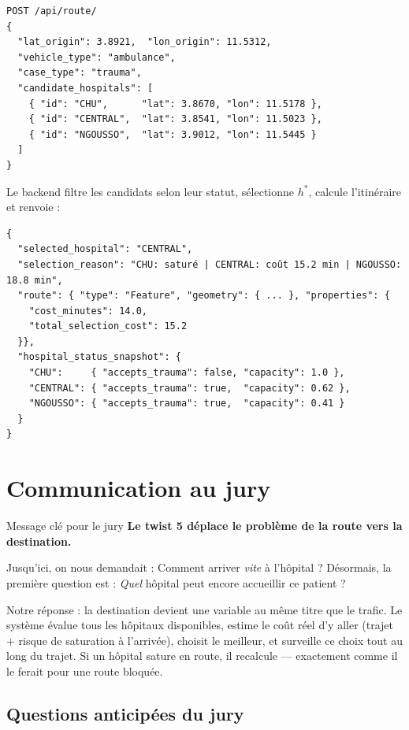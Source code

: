\documentclass[12pt,a4paper]{article}
\theoremstyle{definition}
\theoremstyle{remark}
\begin{document}
\begin{verbatim}
POST /api/route/
{
  "lat_origin": 3.8921,  "lon_origin": 11.5312,
  "vehicle_type": "ambulance",
  "case_type": "trauma",
  "candidate_hospitals": [
    { "id": "CHU",      "lat": 3.8670, "lon": 11.5178 },
    { "id": "CENTRAL",  "lat": 3.8541, "lon": 11.5023 },
    { "id": "NGOUSSO",  "lat": 3.9012, "lon": 11.5445 }
  ]
}
\end{verbatim}

Le backend filtre les candidats selon leur statut, sélectionne
$h^*$, calcule l'itinéraire et renvoie :

\begin{verbatim}
{
  "selected_hospital": "CENTRAL",
  "selection_reason": "CHU: saturé | CENTRAL: coût 15.2 min | NGOUSSO: 18.8 min",
  "route": { "type": "Feature", "geometry": { ... }, "properties": {
    "cost_minutes": 14.0,
    "total_selection_cost": 15.2
  }},
  "hospital_status_snapshot": {
    "CHU":     { "accepts_trauma": false, "capacity": 1.0 },
    "CENTRAL": { "accepts_trauma": true,  "capacity": 0.62 },
    "NGOUSSO": { "accepts_trauma": true,  "capacity": 0.41 }
  }
}
\end{verbatim}

\newpage

\section{Communication au jury}

\begin{jurybox}{Message clé pour le jury}
\textbf{Le twist 5 déplace le problème de la route vers la destination.}

\medskip
Jusqu'ici, on nous demandait : \og{}Comment arriver \emph{vite} à
l'hôpital ?\fg{} Désormais, la première question est :
\og{}\emph{Quel} hôpital peut encore accueillir ce patient ?\fg{}

\medskip
Notre réponse : la destination devient une variable au même titre
que le trafic. Le système évalue tous les hôpitaux disponibles,
estime le coût réel d'y aller (trajet + risque de saturation à
l'arrivée), choisit le meilleur, et surveille ce choix tout au
long du trajet. Si un hôpital sature en route, il recalcule —
exactement comme il le ferait pour une route bloquée.
\end{jurybox}

\subsection{Questions anticipées du jury}
\end{document}
